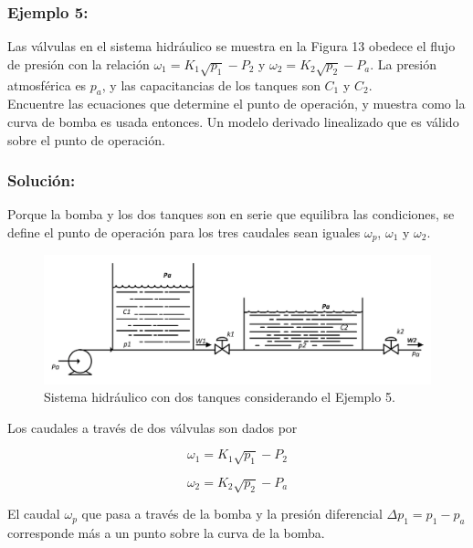 \documentclass[a4paper,12pt,twoside]{proyectotanquesecci}
\begin{document}
\subsubsection{Ejemplo 5:}

Las válvulas en el sistema hidráulico se muestra en la Figura 13 obedece el flujo de presión con la relación $\omega _{1}=K_{1}\sqrt {p_{1}}-P_{2}$ y $\omega _{2}=K_{2}\sqrt {p_{2}}-P_{a}$. La presión atmosférica es $p_{a}$, y las capacitancias de los tanques son $C_{1}$ y $C_{2}$. \\
Encuentre las ecuaciones que determine el punto de operación, y muestra como la curva de bomba es usada entonces. Un modelo derivado linealizado que es válido sobre el punto de operación. \\

\subsubsection{Solución:}

Porque la bomba y los dos tanques son en serie que equilibra las condiciones, se define el punto de operación para los tres caudales sean iguales $\omega_{p}$, $\omega_{1}$ y $\omega_{2}$.

\begin{figure}[h]
\centering
\includegraphics[scale=0.6]{Figura12}
\renewcommand{\figurename}{Fig.}
\caption{Sistema hidráulico con dos tanques considerando el Ejemplo 5.}
\label{Sistema hidráulico con dos tanques considerando el Ejemplo 5.}
\end{figure}

Los caudales a través de dos válvulas son dados por

\begin{equation}
\omega _{1}=K_{1}\sqrt {p_{1}}-P_{2}
\end{equation}

\begin{equation}
\omega _{2}=K_{2}\sqrt {p_{2}}-P_{a}
\end{equation}


El caudal $\omega_{p}$ que pasa a través de la bomba y la presión diferencial $\Delta p_{1}=p_{1}-p_{a}$ corresponde más a un punto sobre la curva de la bomba.
\end{document}
